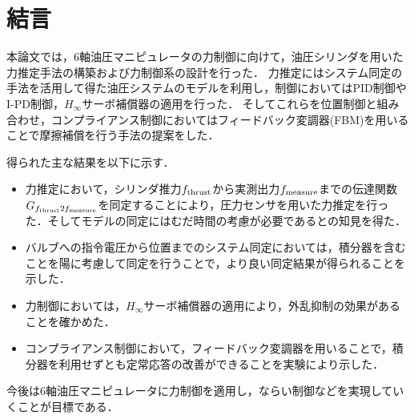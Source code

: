 \chapter{結言}
本論文では，6軸油圧マニピュレータの力制御に向けて，油圧シリンダを用いた力推定手法の構築および力制御系の設計を行った．
力推定にはシステム同定の手法を活用して得た油圧システムのモデルを利用し，制御においてはPID制御やI-PD制御，$H_\infty$サーボ補償器の適用を行った．
そしてこれらを位置制御と組み合わせ，コンプライアンス制御においてはフィードバック変調器(FBM)を用いることで摩擦補償を行う手法の提案をした．

得られた主な結果を以下に示す．
\begin{itemize}
    \item 力推定において，シリンダ推力$f_\mathrm{thrust}$から実測出力$f_\mathrm{measure}$までの伝達関数$G_{f_\mathrm{thrust}2f_\mathrm{measure}}$を同定することにより，圧力センサを用いた力推定を行った．そしてモデルの同定にはむだ時間の考慮が必要であるとの知見を得た．
    \item バルブへの指令電圧から位置までのシステム同定においては，積分器を含むことを陽に考慮して同定を行うことで，より良い同定結果が得られることを示した．
    \item 力制御においては，$H_\infty$サーボ補償器の適用により，外乱抑制の効果があることを確かめた．
    \item コンプライアンス制御において，フィードバック変調器を用いることで，積分器を利用せずとも定常応答の改善ができることを実験により示した．
\end{itemize}

今後は6軸油圧マニピュレータに力制御を適用し，ならい制御などを実現していくことが目標である．
